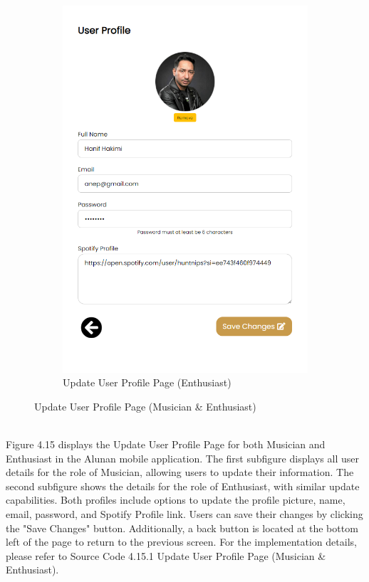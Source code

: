 \begin{enumerate}[1.]
\begin{figure}[h]
\begin{subfigure}[b]{0.4\textwidth}
            \includegraphics[width=\textwidth]{mainmatter/images/frontend/ss/User Profile4 (Musician-Enthusiast).png}
            \caption{Update User Profile Page (Enthusiast)}
            \label{fig:sub2}
        \end{subfigure}
        \caption{Update User Profile Page (Musician \& Enthusiast)}
        \label{fig:myfig54}
    \end{figure} \\
    Figure 4.15 displays the Update User Profile Page for both Musician and Enthusiast in the Alunan mobile application. The first subfigure displays all user details for the role of Musician, allowing users to update their information. The second subfigure shows the details for the role of Enthusiast, with similar update capabilities. Both profiles include options to update the profile picture, name, email, password, and Spotify Profile link. Users can save their changes by clicking the "Save Changes" button. Additionally, a back button is located at the bottom left of the page to return to the previous screen. For the implementation details, please refer to Source Code 4.15.1 Update User Profile Page (Musician \& Enthusiast).

\end{enumerate}
